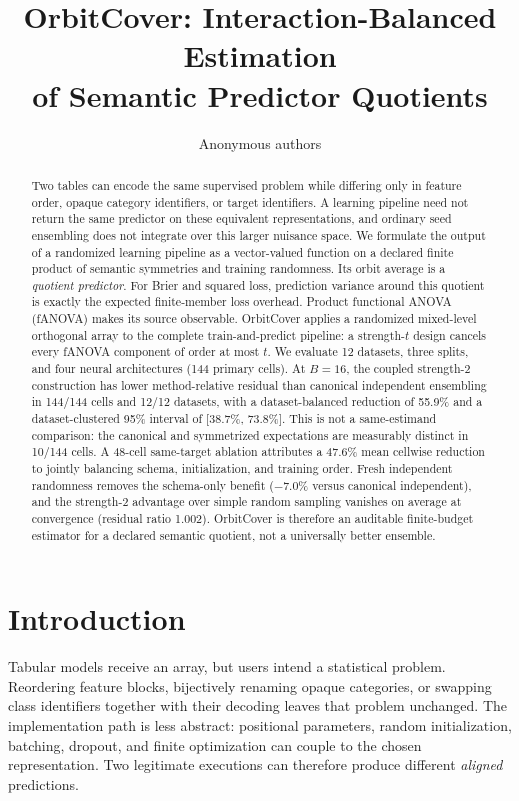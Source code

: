 \documentclass{article}
\title{OrbitCover: Interaction-Balanced Estimation\\
of Semantic Predictor Quotients}
\author{Anonymous authors}
\begin{document}
\maketitle

\begin{abstract}
Two tables can encode the same supervised problem while differing only in
feature order, opaque category identifiers, or target identifiers. A learning
pipeline need not return the same predictor on these equivalent
representations, and ordinary seed ensembling does not integrate over this
larger nuisance space. We formulate the output of a randomized learning
pipeline as a vector-valued function on a declared finite product of semantic
symmetries and training randomness. Its orbit average is a \emph{quotient
predictor}. For Brier and squared loss, prediction variance around this
quotient is exactly the expected finite-member loss overhead. Product
functional ANOVA (fANOVA) makes its source observable. OrbitCover applies a
randomized mixed-level orthogonal array to the complete train-and-predict
pipeline: a strength-$t$ design cancels every fANOVA component of order at
most $t$. We evaluate 12 datasets, three splits, and four neural architectures
(144 primary cells). At $B=16$, the coupled strength-2 construction has lower
method-relative residual than canonical independent ensembling in 144/144
cells and 12/12 datasets, with a dataset-balanced reduction of 55.9\% and a
dataset-clustered 95\% interval of [38.7\%, 73.8\%]. This is not a
same-estimand comparison: the canonical and symmetrized expectations are
measurably distinct in 10/144 cells. A 48-cell same-target ablation attributes
a 47.6\% mean cellwise reduction to jointly balancing schema, initialization,
and training order. Fresh independent randomness removes the schema-only
benefit ($-7.0$\% versus canonical independent), and the strength-2 advantage
over simple random sampling vanishes on average at convergence (residual ratio
1.002). OrbitCover is therefore an auditable finite-budget estimator for a
declared semantic quotient, not a universally better ensemble.
\end{abstract}

\section{Introduction}

Tabular models receive an array, but users intend a statistical problem.
Reordering feature blocks, bijectively renaming opaque categories, or swapping
class identifiers together with their decoding leaves that problem unchanged.
The implementation path is less abstract: positional parameters, random
initialization, batching, dropout, and finite optimization can couple to the
chosen representation. Two legitimate executions can therefore produce
different \emph{aligned} predictions.
\end{document}
